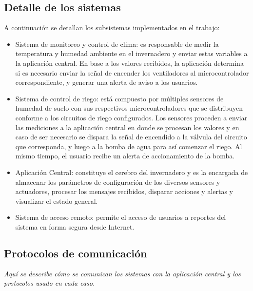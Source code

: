\subsection{Detalle de los sistemas}
\label{Detalle de los sistemas}

A continuación se detallan los subsistemas implementados en el trabajo:

\begin{itemize}
\item Sistema de monitoreo y control de clima: es responsable de medir la temperatura y humedad ambiente en el invernadero y enviar estas variables a la aplicación central. En base a los valores recibidos, la aplicación determina si es necesario enviar la señal de encender los ventiladores al microcontrolador correspondiente, y generar una alerta de aviso a los usuarios.


%

\item Sistema de control de riego: está compuesto por múltiples sensores de humedad de suelo con sus respectivos microcontroladores que se distribuyen conforme a los circuitos de riego configurados. Los sensores proceden a enviar las mediciones a la aplicación central en donde se procesan los valores y en caso de ser necesario se dispara la señal de encendido a la válvula del circuito que corresponda, y luego a la bomba de agua para así comenzar el riego. Al mismo tiempo, el usuario recibe un alerta de accionamiento de la bomba.

\item Aplicación Central: constituye el cerebro del invernadero y es la encargada de almacenar los parámetros de configuración de los diversos sensores y actuadores, procesar los mensajes recibidos, disparar acciones y alertas y visualizar el estado general.

\item Sistema de acceso remoto: permite el acceso de usuarios a reportes del sistema en forma segura desde Internet.   
\end{itemize}

\subsection{Protocolos de comunicación}
\label{Protocolos de comunicación}
\textit{Aquí se describe cómo se comunican los sistemas con la aplicación central y los protocolos usado en cada caso.}

